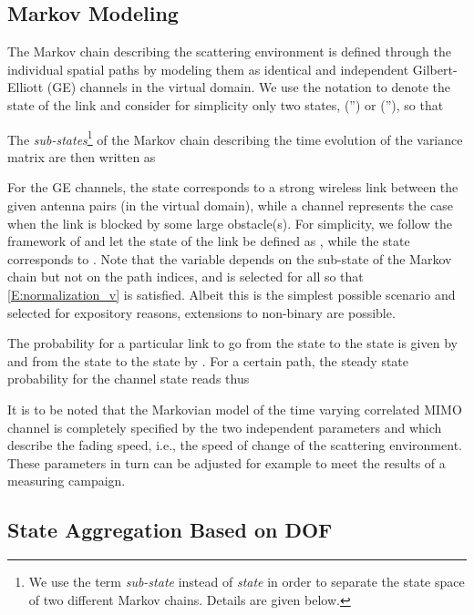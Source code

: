 \documentclass[10pt,conference]{IEEEtran}
\begin{document}
\subsection{Markov Modeling}
    \label{Sec:MarkovModleingCorMIMO}

The Markov chain describing the scattering environment is defined through the individual spatial paths by modeling them as identical and independent Gilbert-Elliott (GE) channels in the virtual domain.
We use the notation  to denote the state of the link  and consider
for simplicity only two states,  ('') or  (''), so that

The \emph{sub-states}\footnote{We use the term \emph{sub-state} instead of \emph{state} in order to separate the state space of two different Markov chains.  Details are given below.}
 of the Markov chain describing the time evolution of the variance matrix  are then written as

For the GE channels, the  state corresponds to a strong wireless link between the given antenna pairs (in the virtual domain), while a  channel represents the case when the link is blocked by some large obstacle(s).
For simplicity, we follow the framework of \cite{Raghavan:2010:WKM} and let the  state of the link  be defined as , while the  state corresponds to .  Note that the variable  depends on the sub-state
 of the Markov chain
but not on the path indices, and is selected for all  so that \eqref{E:normalization_v} is satisfied.  Albeit this is the simplest possible scenario and selected for expository reasons, extensions to non-binary  are possible.





The probability for a particular link  to go from the  state to the  state is given by  and from the  state to the  state by .  For a certain path, the steady state probability for the  channel state reads thus

It is to be noted that the Markovian model of the time varying correlated MIMO channel is completely specified by the two independent parameters  and  which describe the fading speed, i.e., the speed of change of the scattering environment. These parameters in turn
can be adjusted for example to meet the results of a measuring campaign.



\subsection{State Aggregation Based on DOF}
\label{subsec:StateAggBasedonDOF}
\end{document}
